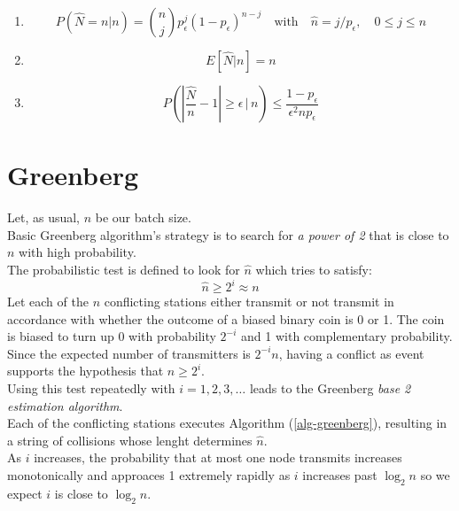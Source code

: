 \documentclass[12pt,a4paper]{report}
\newcommand{\pc}{p_{\epsilon}}
\begin{document}
\begin{enumerate}[1)]
\item \begin{equation}P(\hat{N}=n|n)={n \choose j}\pc^{j}(1-\pc)^{n-j} \quad \textrm{with} \quad \hat{n}=j/\pc, \quad 0\leq j\leq n\end{equation}
\item \begin{equation}E[\hat{N}|n]=n\end{equation}
\item  \begin{equation}
P\left( \left| \frac{\hat{N}}{n}-1\right| \geq \epsilon  \,|\, n \right) \leq \frac{1-\pc}{\epsilon^{2}n\pc}
\label{eq:cidon-cheby}
 \end{equation}
\end{enumerate}
\clearpage
\section{Greenberg}

Let, as usual, $n$ be our batch size.\\
Basic Greenberg algorithm's strategy is to search for \emph{a power of 2} that is close to $n$ with high probability.\\
The probabilistic test is defined to look for $\hat{n}$ which tries to satisfy:\\
\begin{equation}
\hat{n}\geq 2^{i} \approx n
\end{equation}
Let each of the $n$ conflicting stations either transmit or not transmit in accordance with whether the outcome of a biased binary coin is 0 or 1. The coin is biased to turn up 0 with probability  $2^{-i}$ and 1 with complementary probability. Since the expected number of transmitters is $2^{-i}n$, having a conflict as event supports the hypothesis that $n\geq2^{i}$.\\
Using this test repeatedly with $i=1, 2, 3, \ldots$ leads to the Greenberg \emph{base 2 estimation algorithm}.\\
Each of the conflicting stations executes Algorithm (\ref{alg-greenberg}), resulting in a string of collisions whose lenght determines $\hat{n}$.\\

As $i$ increases, the probability that at most one node transmits increases monotonically and approaces 1 extremely rapidly as $i$ increases past $\log_{2}n$ so we expect $i$ is close to $\log_{2}n$.\\
\end{document}
